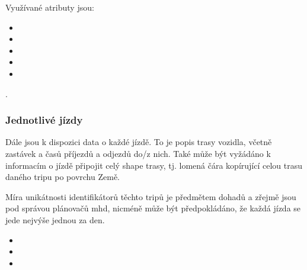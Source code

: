 \bigbreak

Využívané atributy jsou:

\begin{itemize}
	\item {}

	\item {}

	\item {}

	\item {}

	\item {}
\end{itemize}.

\subsubsection{Jednotlivé jízdy}

Dále jsou k dispozici data o každé jízdě. To je popis trasy vozidla, včetně zastávek a časů příjezdů a odjezdů do/z nich. Také může být vyžádáno k informacím o jízdě připojit celý shape trasy, tj. lomená čára kopírující celou trasu daného tripu po povrchu Země.

\bigbreak

 Míra unikátnosti identifikátorů těchto tripů je předmětem dohadů a zřejmě jsou pod správou plánovačů \gls{mhd}, nicméně může být předpokládáno, že každá jízda se jede nejvýše jednou za den.

\begin{itemize}
	\item {}

	\item {}

	\item {}
\end{itemize}

